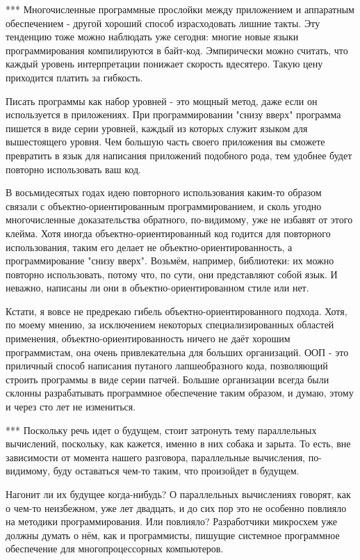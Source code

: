 \documentclass[ebook,12pt,oneside,openany]{memoir}
\begin{document}
*** Многочисленные программные прослойки между приложением и
аппаратным обеспечением - другой хороший способ израсходовать лишние
такты. Эту тенденцию тоже можно наблюдать уже сегодня: многие новые
языки программирования компилируются в байт-код. Эмпирически можно
считать, что каждый уровень интерпретации понижает скорость вдесятеро.
Такую цену приходится платить за гибкость.

Писать программы как набор уровней - это мощный метод, даже если он
используется в приложениях. При программировании "снизу вверх"
программа пишется в виде серии уровней, каждый из которых служит
языком для вышестоящего уровня. Чем большую часть своего приложения вы
сможете превратить в язык для написания приложений подобного рода, тем
удобнее будет повторно использовать ваш код.

В восьмидесятых годах идею повторного использования каким-то образом
связали с объектно-ориентированным программированием, и сколь угодно
многочисленные доказательства обратного, по-видимому, уже не избавят
от этого клейма. Хотя иногда объектно-ориентированный код годится для
повторного использования, таким его делает не
объектно-ориентированность, а программирование "снизу вверх". Возьмём,
например, библиотеки: их можно повторно использовать, потому что, по
сути, они представляют собой язык. И неважно, написаны ли они в
объектно-ориентированном стиле или нет.

Кстати, я вовсе не предрекаю гибель объектно-ориентированного подхода.
Хотя, по моему мнению, за исключением некоторых специализированных
областей применения, объектно-ориентированность ничего не даёт хорошим
программистам, она очень привлекательна для больших организаций. ООП -
это приличный способ написания путаного лапшеобразного кода,
позволяющий строить программы в виде серии патчей. Большие организации
всегда были склонны разрабатывать программное обеспечение таким
образом, и думаю, этому и через сто лет не измениться.

*** Поскольку речь идет о будущем, стоит затронуть тему параллельных
вычислений, поскольку, как кажется, именно в них собака и зарыта. То
есть, вне зависимости от момента нашего разговора, параллельные
вычисления, по-видимому, буду оставаться чем-то таким, что произойдет
в будущем.

Нагонит ли их будущее когда-нибудь? О параллельных вычислениях
говорят, как о чем-то неизбежном, уже лет двадцать, и до сих пор это
не особенно повлияло на методики программирования. Или повлияло?
Разработчики микросхем уже должны думать о нём, как и программисты,
пишущие системное программное обеспечение для многопроцессорных
компьютеров.
\end{document}
